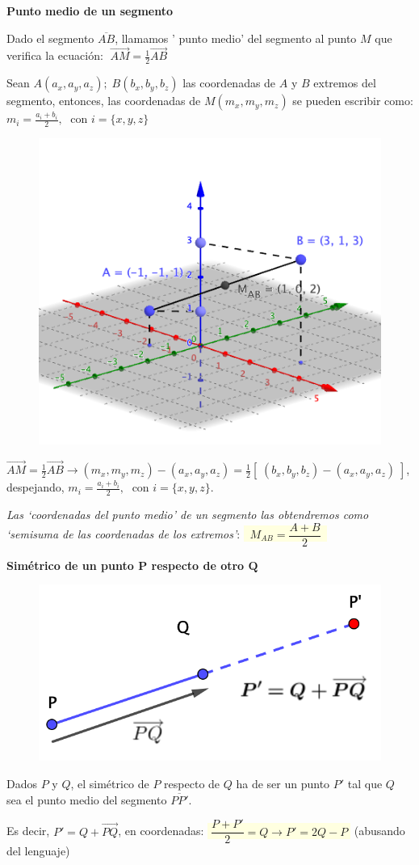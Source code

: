 \vspace{-5mm} \textbf{Punto medio de un segmento}

\begin{multicols}{2}
Dado el segmento $\overline{AB}$, llamamos ' punto medio' del segmento al punto  $M$ que verifica la ecuación: $\; \overrightarrow{AM}=\frac 1 2 \overrightarrow{AB}\; $

Sean $A(a_x,a_y,a_z); \; B(b_x,b_y,b_z)$ las coordenadas de $A$ y $B$ extremos del segmento, entonces, las coordenadas de $M(m_x,m_y,m_z)$ se pueden escribir como: $m_i=\frac {a_i+b_i}{2},\; \text{ con } i=\{x,y,z\}$

\begin{figure}[H]
	\centering
	\includegraphics[width=.55\textwidth]{imagenes/imagenes09/T09IM10.png}
\end{figure}
\end{multicols}

\noindent \footnotesize{\textcolor{gris}{$\overrightarrow{AM}=\frac 1 2 \overrightarrow{AB} \to (m_x,m_y,m_z)-(a_x,a_y,a_z)=\frac 1 2 [\;(b_x,b_y,b_z)-(a_x,a_y,a_z)\;]$, despejando, $m_i=\frac {a_i+b_i}{2},\; \text{ con } i=\{x,y,z\}$}}\normalsize{.}

\textit{Las `coordenadas del punto medio' de un segmento las obtendremos como `semisuma de las coordenadas de los extremos'}: \colorbox{LightYellow}{$\; \boxed{\; M_{AB}=\dfrac {A+B}{2}\; }\; $}

\vspace{5mm}\textbf{Simétrico de un punto $\boldsymbol{P}$ respecto de otro  $\boldsymbol{Q}$}
\begin{multicols}{2}
\begin{figure}[H]
	\centering
	\includegraphics[width=.45\textwidth]{imagenes/imagenes09/T09IM12.png}
\end{figure}
Dados $P$ y $Q$, el simétrico de $P$ respecto de $Q$ ha de ser un punto $P'$ tal que $Q$ sea el punto medio del segmento $\overline{PP'}$.


\end{multicols}
Es decir, $P'=Q+\overrightarrow{PQ}$, en coordenadas: \colorbox{LightYellow}{$\boxed{\;\dfrac {P+P'}{2}=Q \to P'=2Q-P\;}$} \textcolor{gris}{(abusando del lenguaje)}

